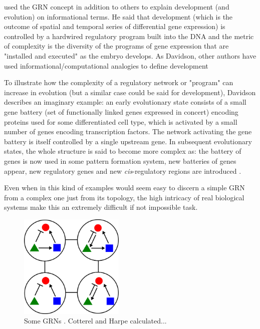 \cite{Davidson2001} used the GRN concept in addition to others to explain development (and evolution) on informational terms. He said that development (which is the outcome of spatial and temporal series of differential gene expression) is controlled by a hardwired regulatory program built into the DNA and the metric of complexity is the diversity of the programs of gene expression that are "installed and executed" as the embryo develops. As Davidson, other authors have used informational/computational analogies to define development \citep{Apter1965,monod2012cytodifferentiation,mayr1997evolution} 

To illustrate how the complexity of a regulatory network or "program" can increase in evolution (but a similar case could be said for development), Davidson describes an imaginary example:
an early evolutionary state consists of a small gene battery (set of functionally linked genes expressed in concert) encoding proteins used for some differentiated cell type, which is activated by a small number of genes encoding transcription factors. The network activating the gene battery is itself controlled by a single upstream gene.
In subsequent evolutionary states, the whole structure is said to become more complex as: the battery of genes is now used in some pattern formation system, new batteries of genes appear, new regulatory genes and new \textit{cis}-regulatory regions are introduced  \citep{Davidson2001}.

Even when in this kind of examples would seem easy to discern a simple GRN from a complex one just from its topology, the high intricacy of real biological systems make this an extremely difficult if not impossible task. 

\begin{figure}[h]
  \includegraphics[width=5cm]{./Images/GRNs.png}
  \centering
  \caption{
  Some GRNs . Cotterel and Harpe calculated... \citep{Cotterell2010}
 }
  \label{fig:GRNs}
\end{figure}

